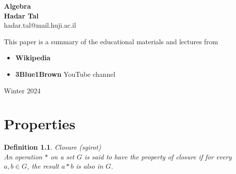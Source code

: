 \documentclass[11pt]{book} %
\newtheorem{definition}{Definition}[section]
\begin{document}
\begin{titlepage}
    \begin{center}
     {\huge\bfseries 
    Algebra     \\}
     \vspace{1.5cm}
     {\Large\bfseries Hadar Tal}\\[5pt]
     hadar.tal@mail.huji.ac.il\\[14pt]
     \vspace{2cm}
     {This paper is a summary of the educational materials and lectures from 
     \begin{itemize}
        \item \textbf{Wikipedia}
        \item \textbf{3Blue1Brown} YouTube channel
     \end{itemize}
     }

     \vfill
    {Winter 2024}
    \end{center}
\end{titlepage}


\frontmatter
\tableofcontents


\mainmatter
\chapter{Properties}
\begin{definition}{Closure (sgirot) } \\
An operation \(*\) on a set \(G\) is said to have the property of closure if for every \(a, b \in G\), the result \(a * b\) is also in \(G\).
\end{definition}
\end{document}
